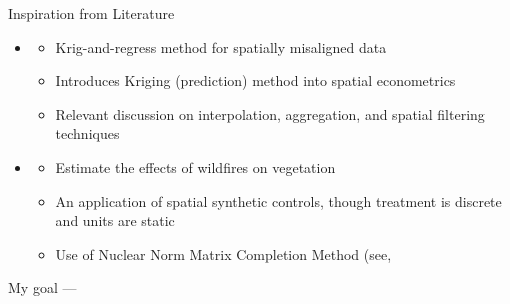 \begin{frame}{Inspiration from Literature}

\begin{itemize}
    \item \cite{pouliot2022}
      \begin{itemize}
        \item Krig-and-regress method for spatially misaligned data
        \item Introduces Kriging (prediction) method into spatial econometrics
        \item Relevant discussion on interpolation, aggregation, and spatial filtering techniques
      \end{itemize}
    \vspace{-7pt}
    \item \cite{serraburieletal2020}
      \begin{itemize}
        \item Estimate the effects of wildfires on vegetation
        \item An application of spatial synthetic controls, though treatment is discrete and units are static
        \item Use of Nuclear Norm Matrix Completion Method (see, \cite{athey2021}
      \end{itemize}
  \end{itemize}
\end{frame}

\begin{frame}{My goal}
---
\end{frame}